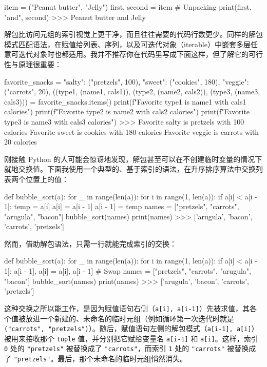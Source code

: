 \begin{codebox}[python]
item = ("Peanut butter", "Jelly")
first, second = item  # Unpacking
print(first, "and", second)
>>>
Peanut butter and Jelly
\end{codebox}

解包比访问元组的索引视觉上更干净，而且往往需要的代码行数更少。同样的解包模式匹配语法，在赋值给列表、序列，以及可迭代对象（iterable）中嵌套多层任意可迭代对象时也都适用。我并不推荐你在代码里写成下面这样，但了解它的可行性与原理很重要：

\begin{codebox}[python]
favorite_snacks = {
    "salty": ("pretzels", 100),
    "sweet": ("cookies", 180),
    "veggie": ("carrots", 20),
}
((type1, (name1, cals1)),
 (type2, (name2, cals2)),
 (type3, (name3, cals3))) = favorite_snacks.items()
print(f"Favorite {type1} is {name1} with {cals1} calories")
print(f"Favorite {type2} is {name2} with {cals2} calories")
print(f"Favorite {type3} is {name3} with {cals3} calories")
>>>
Favorite salty is pretzels with 100 calories
Favorite sweet is cookies with 180 calories
Favorite veggie is carrots with 20 calories
\end{codebox}

刚接触 Python 的人可能会惊讶地发现，解包甚至可以在不创建临时变量的情况下就地交换值。下面我使用一个典型的、基于索引的语法，在升序排序算法中交换列表两个位置上的值：

\begin{codebox}[python]
def bubble_sort(a):
    for _ in range(len(a)):
        for i in range(1, len(a)):
            if a[i] < a[i - 1]:
                temp = a[i]
                a[i] = a[i - 1]
                a[i - 1] = temp
names = ["pretzels", "carrots", "arugula", "bacon"]
bubble_sort(names)
print(names)
>>>
['arugula', 'bacon', 'carrots', 'pretzels']
\end{codebox}

然而，借助解包语法，只需一行就能完成索引的交换：

\begin{codebox}[python]
def bubble_sort(a):
    for _ in range(len(a)):
        for i in range(1, len(a)):
            if a[i] < a[i - 1]:
                a[i - 1], a[i] = a[i], a[i - 1]  # Swap
names = ["pretzels", "carrots", "arugula", "bacon"]
bubble_sort(names)
print(names)
>>>
['arugula', 'bacon', 'carrots', 'pretzels']
\end{codebox}

这种交换之所以能工作，是因为赋值语句右侧（\texttt{a[i], a[i-1]}）先被求值，其各个值被放进一个新建的、未命名的临时元组（例如循环第一次迭代时就是 \texttt{("carrots", "pretzels")}）。随后，赋值语句左侧的解包模式（\texttt{a[i-1], a[i]}）被用来接收那个 \texttt{tuple} 值，并分别把它赋给变量名 \texttt{a[i-1]} 和 \texttt{a[i]}。这样，索引 \texttt{0} 处的 \texttt{"pretzels"} 被替换成了 \texttt{"carrots"}，而索引 \texttt{1} 处的 \texttt{"carrots"} 被替换成了 \texttt{"pretzels"}。最后，那个未命名的临时元组悄然消失。

